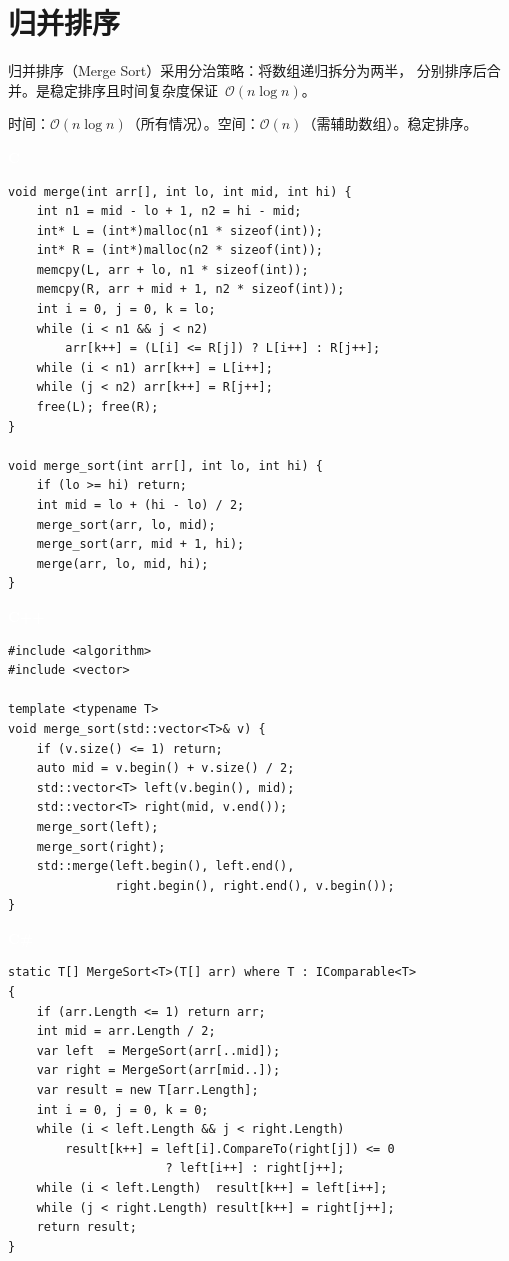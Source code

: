 \documentclass[12pt,a4paper,fontset=fandol]{ctexbook}
\newcommand{\clabel}{%
  \noindent\begin{tcolorbox}[sharp corners,colback=cheadbg,colframe=cheadbg,
    left=6pt,right=6pt,top=2pt,bottom=2pt,boxrule=0pt]
  \textcolor{white}{\small\bfseries\sffamily C}\end{tcolorbox}%
}
\newcommand{\cpplabel}{%
  \noindent\begin{tcolorbox}[sharp corners,colback=cppheadbg,colframe=cppheadbg,
    left=6pt,right=6pt,top=2pt,bottom=2pt,boxrule=0pt]
  \textcolor{white}{\small\bfseries\sffamily C++}\end{tcolorbox}%
}
\newcommand{\csharplabel}{%
  \noindent\begin{tcolorbox}[sharp corners,colback=csharpheadbg,colframe=csharpheadbg,
    left=6pt,right=6pt,top=2pt,bottom=2pt,boxrule=0pt]
  \textcolor{white}{\small\bfseries\sffamily C\#}\end{tcolorbox}%
}
\newcommand{\bigO}[1]{\mathcal{O}(#1)}
\begin{document}
\chapter{归并排序}

归并排序（Merge Sort）采用分治策略：将数组递归拆分为两半，
分别排序后合并。是稳定排序且时间复杂度保证~$\bigO{n \log n}$。

\begin{complexitybox}
  时间：$\bigO{n \log n}$（所有情况）。空间：$\bigO{n}$（需辅助数组）。稳定排序。
\end{complexitybox}

\clabel
\begin{lstlisting}[style=cstyle]
void merge(int arr[], int lo, int mid, int hi) {
    int n1 = mid - lo + 1, n2 = hi - mid;
    int* L = (int*)malloc(n1 * sizeof(int));
    int* R = (int*)malloc(n2 * sizeof(int));
    memcpy(L, arr + lo, n1 * sizeof(int));
    memcpy(R, arr + mid + 1, n2 * sizeof(int));
    int i = 0, j = 0, k = lo;
    while (i < n1 && j < n2)
        arr[k++] = (L[i] <= R[j]) ? L[i++] : R[j++];
    while (i < n1) arr[k++] = L[i++];
    while (j < n2) arr[k++] = R[j++];
    free(L); free(R);
}

void merge_sort(int arr[], int lo, int hi) {
    if (lo >= hi) return;
    int mid = lo + (hi - lo) / 2;
    merge_sort(arr, lo, mid);
    merge_sort(arr, mid + 1, hi);
    merge(arr, lo, mid, hi);
}
\end{lstlisting}

\cpplabel
\begin{lstlisting}[style=cppstyle]
#include <algorithm>
#include <vector>

template <typename T>
void merge_sort(std::vector<T>& v) {
    if (v.size() <= 1) return;
    auto mid = v.begin() + v.size() / 2;
    std::vector<T> left(v.begin(), mid);
    std::vector<T> right(mid, v.end());
    merge_sort(left);
    merge_sort(right);
    std::merge(left.begin(), left.end(),
               right.begin(), right.end(), v.begin());
}
\end{lstlisting}

\csharplabel
\begin{lstlisting}[style=csharpstyle]
static T[] MergeSort<T>(T[] arr) where T : IComparable<T>
{
    if (arr.Length <= 1) return arr;
    int mid = arr.Length / 2;
    var left  = MergeSort(arr[..mid]);
    var right = MergeSort(arr[mid..]);
    var result = new T[arr.Length];
    int i = 0, j = 0, k = 0;
    while (i < left.Length && j < right.Length)
        result[k++] = left[i].CompareTo(right[j]) <= 0
                      ? left[i++] : right[j++];
    while (i < left.Length)  result[k++] = left[i++];
    while (j < right.Length) result[k++] = right[j++];
    return result;
}
\end{lstlisting}
\end{document}
